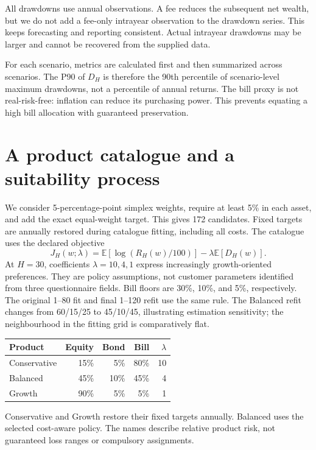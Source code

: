 \documentclass[11pt,a4paper]{article}
\newcommand{\E}{\mathbb{E}}
\begin{document}
All drawdowns use annual observations. A fee reduces the subsequent net wealth,
but we do not add a fee-only intrayear observation to the drawdown series. This
keeps forecasting and reporting consistent. Actual intrayear drawdowns may be
larger and cannot be recovered from the supplied data.

For each scenario, metrics are calculated first and then summarized across
scenarios. The P90 of $D_H$ is therefore the 90th percentile of scenario-level
maximum drawdowns, not a percentile of annual returns. The bill proxy is not
real-risk-free: inflation can reduce its purchasing power. This prevents
equating a high bill allocation with guaranteed preservation.

\newpage
\section{A product catalogue and a suitability process}
We consider 5-percentage-point simplex weights, require at least 5\% in each
asset, and add the exact equal-weight target. This gives 172 candidates. Fixed
targets are annually restored during catalogue fitting, including all costs.
The catalogue uses the declared objective
\begin{equation}
 J_H(w;\lambda)=\E[\log(R_H(w)/100)]-\lambda\E[D_H(w)].
\end{equation}
At $H=30$, coefficients $\lambda=10,4,1$ express increasingly growth-oriented
preferences. They are policy assumptions, not customer parameters identified
from three questionnaire fields. Bill floors are 30\%, 10\%, and 5\%,
respectively. The original 1--80 fit and final 1--120 refit use the same rule.
The Balanced refit changes from 60/15/25 to 45/10/45, illustrating estimation
sensitivity; the neighbourhood in the fitting grid is comparatively flat.

\begin{center}
\begin{tabular}{lrrrr}
\toprule
Product & Equity & Bond & Bill & $\lambda$\\\midrule
Conservative & 15\% & 5\% & 80\% & 10\\
Balanced & 45\% & 10\% & 45\% & 4\\
Growth & 90\% & 5\% & 5\% & 1\\\bottomrule
\end{tabular}
\end{center}
Conservative and Growth restore their fixed targets annually. Balanced uses
the selected cost-aware policy. The names describe relative product risk,
not guaranteed loss ranges or compulsory assignments.
\end{document}
